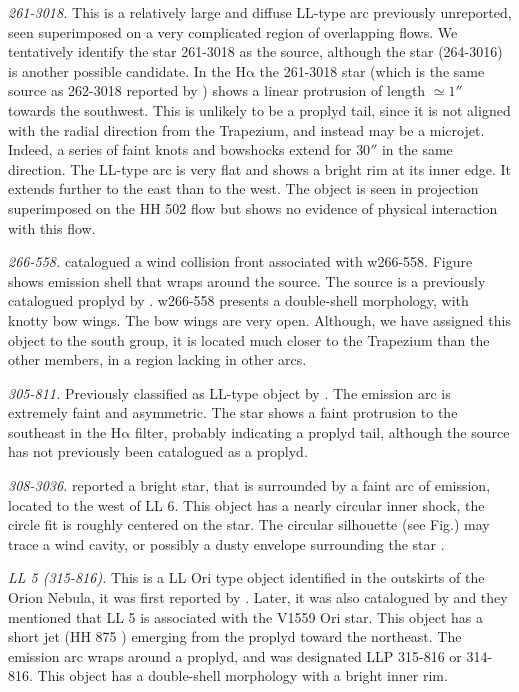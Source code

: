 \documentclass[apj, twocolumn]{aastex63}
\newcommand\ha{\ensuremath{\mathrm{H\alpha}}}
\begin{document}
\textit{261-3018.} This is a relatively large and diffuse LL-type
arc previously unreported, seen superimposed on a very complicated
region of overlapping flows. We tentatively identify the star 261-3018
as the source, although the star (264-3016) is another possible
candidate. In the \ha{} the 261-3018 star (which is the same source
as 262-3018 reported by \citealp{Bally:2006a})  shows a linear protrusion
of length \(\simeq1''\) towards the southwest. This is unlikely to be
a proplyd tail, since it is not aligned with the radial direction from
the Trapezium, and instead may be a microjet. Indeed, a series of faint
knots and bowshocks extend for \(30''\) in the same direction.
The LL-type arc is very flat and shows a bright rim at its inner edge.
It extends further to the east than to the west. The object is seen
in projection superimposed on the HH 502 flow but shows no evidence
of physical interaction with this flow.

\textit{266-558.} \citet{Bally:2000a} catalogued a wind collision
front associated with w266-558. Figure shows emission shell that
wraps around the source. The source is a previously catalogued
proplyd by \citet{Ricci:2008a}. w266-558 presents a double-shell
morphology, with knotty bow wings. The bow wings are very open.
Although, we have assigned this object to the south group, it is
located much closer to the Trapezium than the other members, in
a region lacking in other arcs.

\textit{305-811.} Previously classified as LL-type object
by \citet{Bally:2006a}. The emission arc is extremely faint
and asymmetric. The star shows  a faint protrusion to the
southeast in the \ha{} filter, probably indicating a proplyd
tail, although the source has not previously been catalogued as
a proplyd.    

\textit{308-3036.} \citet{Bally:2006a} reported a bright star,
that is surrounded by a faint arc of emission, located to the west
of LL 6. This object has a nearly circular inner shock, the circle
fit is roughly centered on the star. The circular silhouette
(see Fig.) may trace a wind cavity, or possibly a dusty envelope
surrounding the star \citep{Bally:2006a}.       

\textit{LL 5 (315-816).} This is a LL Ori type object identified in
the outskirts of the Orion Nebula, it was first reported by
\citet{Bally:2001a}. Later, it was also catalogued by
\citet{Bally:2006a} and they mentioned that LL 5 is associated
with the  V1559 Ori star. This object has a short jet (HH 875
\citealp{Bally:2006a}) emerging from the proplyd toward the northeast.
The emission arc wraps around a proplyd, and was designated LLP 315-816
or 314-816. This object has a double-shell morphology with a bright
inner rim.
       
\end{document}
